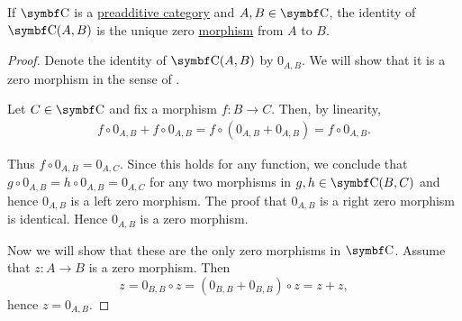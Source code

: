 \begin{proposition}\label{def:preadditive_zero_morphisms}
  If \( \Cat{C} \) is a \hyperref[def:preadditive_category]{preadditive category} and \( A, B \in \Cat{C} \), the identity of \( \Cat{C}(A, B) \) is the unique zero \hyperref[def:zero_morphism]{morphism} from \( A \) to \( B \).
\end{proposition}
\begin{proof}
  Denote the identity of \( \Cat{C}(A, B) \) by \( 0_{A,B} \). We will show that it is a zero morphism in the sense of .

  Let \( C \in \Cat{C} \) and fix a morphism \( f: B \to C \). Then, by linearity,
  \begin{align*}
    f \circ 0_{A,B} + f \circ 0_{A,B}
    =
    f \circ (0_{A,B} + 0_{A,B})
    =
    f \circ 0_{A,B}.
  \end{align*}

  Thus \( f \circ 0_{A,B} = 0_{A,C} \). Since this holds for any function, we conclude that \( g \circ 0_{A,B} = h \circ 0_{A,B} = 0_{A,C} \) for any two morphisms in \( g, h \in \Cat{C}(B,C) \) and hence \( 0_{A,B} \) is a left zero morphism. The proof that \( 0_{A,B} \) is a right zero morphism is identical. Hence \( 0_{A,B} \) is a zero morphism.

  Now we will show that these are the only zero morphisms in \( \Cat{C} \). Assume that \( z: A \to B \) is a zero morphism. Then
  \begin{equation*}
    z = 0_{B,B} \circ z = (0_{B,B} + 0_{B,B}) \circ z = z + z,
  \end{equation*}
  hence \( z = 0_{A,B} \).
\end{proof}

